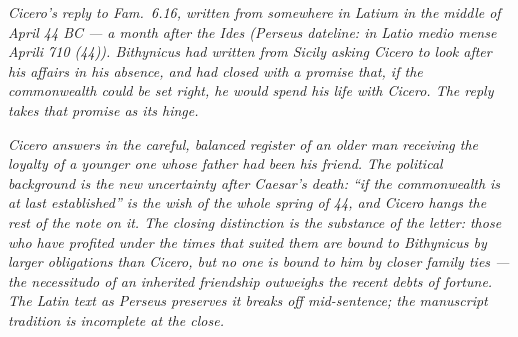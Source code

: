 
\textit{Cicero's reply to \textit{Fam.}~6.16, written from somewhere
in Latium in the middle of April 44 BC --- a month after the Ides
(Perseus dateline: \textit{in Latio medio mense Aprili 710 (44)}).
Bithynicus had written from Sicily asking Cicero to look after his
affairs in his absence, and had closed with a promise that, if the
commonwealth could be set right, he would spend his life with
Cicero. The reply takes that promise as its hinge.}

\textit{Cicero answers in the careful, balanced register of an older
man receiving the loyalty of a younger one whose father had been his
friend. The political background is the new uncertainty after
Caesar's death: ``if the commonwealth is at last established'' is
the wish of the whole spring of 44, and Cicero hangs the rest of the
note on it. The closing distinction is the substance of the letter:
those who have profited under the times that suited them are bound
to Bithynicus by larger obligations than Cicero, but no one is bound
to him by closer family ties --- the \textit{necessitudo} of an
inherited friendship outweighs the recent debts of fortune. The
Latin text as Perseus preserves it breaks off mid-sentence; the
manuscript tradition is incomplete at the close.}
